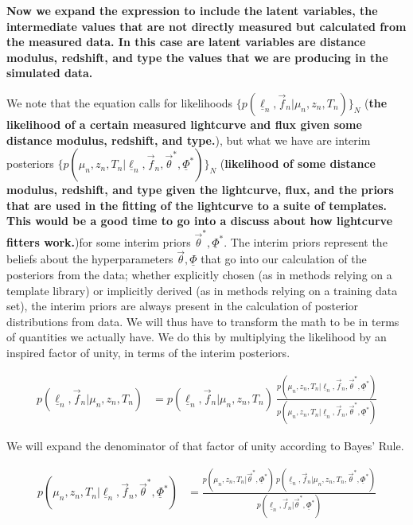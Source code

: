 \documentclass[12pt, onecolumn]{emulateapj}
\newcommand{\textul}{\underline}
\begin{document}
{\bf Now we expand the expression to include the latent variables, the intermediate values that are not directly measured but calculated from the measured data. In this case are latent variables are distance modulus, redshift, and type the values that we are producing in the simulated data.}

We note that the equation calls for likelihoods $\{p(\textul{\ell}_{n}, \vec{f}_{n} | \mu_{n}, z_{n}, T_{n})\}_{N}$ ({\bf the likelihood of a certain measured lightcurve and flux given some distance modulus, redshift, and type.}), but what we have are interim posteriors $\{p(\mu_{n}, z_{n}, T_{n} | \textul{\ell}_{n}, \vec{f}_{n}, \vec{\theta}^{*}, \textul{\Phi}^{*})\}_{N}$ ({\bf likelihood of some distance modulus, redshift, and type given the lightcurve, flux, and the priors that are used in the fitting of the lightcurve to a suite of templates. This would be a good time to go into a discuss about how lightcurve fitters work.})for some interim priors $\vec{\theta}^{*}, \textul{\Phi}^{*}$.  The interim priors represent the beliefs about the hyperparameters $\vec{\theta}, \textul{\Phi}$ that go into our calculation of the posteriors from the data; whether explicitly chosen (as in methods relying on a template library) or implicitly derived (as in methods relying on a training data set), the interim priors are always present in the calculation of posterior distributions from data.  We will thus have to transform the math to be in terms of quantities we actually have.  We do this by multiplying the likelihood by an inspired factor of unity, in terms of the interim posteriors.

\begin{align}
p(\textul{\ell}_{n}, \vec{f}_{n} | \mu_{n}, z_{n}, T_{n}) &= p(\textul{\ell}_{n}, \vec{f}_{n} | \mu_{n}, z_{n}, T_{n})\ \frac{p(\mu_{n}, z_{n}, T_{n} | \textul{\ell}_{n}, \vec{f}_{n}, \vec{\theta}^{*}, \textul{\Phi}^{*})}{p(\mu_{n}, z_{n}, T_{n} | \textul{\ell}_{n}, \vec{f}_{n}, \vec{\theta}^{*}, \textul{\Phi}^{*})}
\end{align}

We will expand the denominator of that factor of unity according to Bayes' Rule.

\begin{align}
p(\mu_{n}, z_{n}, T_{n}|\textul{\ell}_{n}, \vec{f}_{n}, \vec{\theta}^{*}, \textul{\Phi}^{*}) &= \frac{p(\mu_{n}, z_{n}, T_{n} | \vec{\theta}^{*}, \textul{\Phi}^{*})\ p(\textul{\ell}_{n}, \vec{f}_{n} | \mu_{n}, z_{n}, T_{n}, \vec{\theta}^{*}, \textul{\Phi}^{*})}{p(\textul{\ell}_{n}, \vec{f}_{n} | \vec{\theta}^{*}, \textul{\Phi}^{*})}
\end{align}
\end{document}
